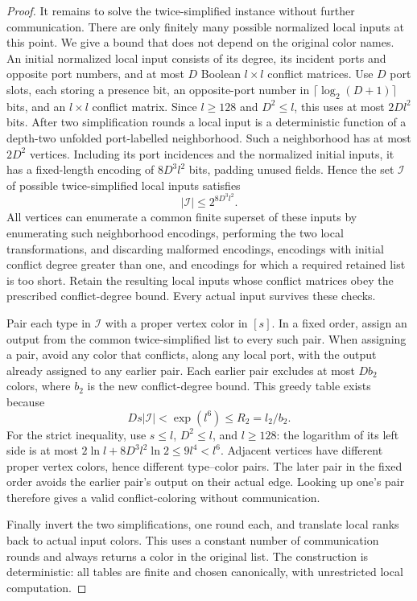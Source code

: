 \documentclass[11pt]{article}
\theoremstyle{definition}
\theoremstyle{remark}
\begin{document}
\begin{proof}
It remains to solve the twice-simplified instance without further
communication.  There are only finitely many possible normalized
local inputs at this point.  We give a bound that does not depend on
the original color names.  An initial normalized local input consists
of its degree, its incident ports and opposite port numbers, and at
most $D$ Boolean $l\times l$ conflict matrices.  Use $D$ port slots, each storing a presence bit, an opposite-port number in $\lceil\log_2(D+1)\rceil$ bits, and an $l\times l$ conflict matrix. Since $l\ge128$ and $D^2\le l$, this uses at most $2Dl^2$ bits.  After two simplification rounds a local
input is a deterministic function of a depth-two unfolded port-labelled
neighborhood.  Such a neighborhood has at most $2D^2$ vertices.
Including its port incidences and the normalized initial inputs,
it has a fixed-length encoding of $8D^3l^2$ bits, padding unused fields.
Hence the set
$\mathcal I$ of possible twice-simplified local inputs satisfies
\[
 |\mathcal I|\le2^{8D^3l^2}.
\]
All vertices can enumerate a common finite superset of these inputs
by enumerating such neighborhood encodings, performing the two
local transformations, and discarding malformed encodings, encodings with initial conflict degree greater than one, and encodings for which a required retained list is too short. Retain the resulting local inputs whose conflict matrices obey the prescribed conflict-degree bound. Every actual input survives these checks.

Pair each type in $\mathcal I$ with a proper vertex color in $[s]$.
In a fixed order, assign an output from the common twice-simplified
list to every such pair.  When assigning a pair, avoid any color
that conflicts, along any local port, with the output already assigned
to any earlier pair.  Each earlier pair excludes at most $Db_2$
colors, where $b_2$ is the new conflict-degree bound.  This greedy
table exists because
\[
 D s|\mathcal I|<\exp(l^6)\le R_2=l_2/b_2.
\]
For the strict inequality, use $s\le l$, $D^2\le l$, and $l\ge128$:
the logarithm of its left side is at most
$2\ln l+8D^3l^2\ln2\le9l^4<l^6$.
Adjacent vertices have different proper vertex colors, hence different
type--color pairs.  The later pair in the fixed order avoids the
earlier pair's output on their actual edge.  Looking up one's pair
therefore gives a valid conflict-coloring without communication.

Finally invert the two simplifications, one round each, and translate
local ranks back to actual input colors.  This uses a constant number
of communication rounds and always returns a color in the original
list.  The construction is deterministic: all tables are finite and
chosen canonically, with unrestricted local computation.
\end{proof}
\end{document}

